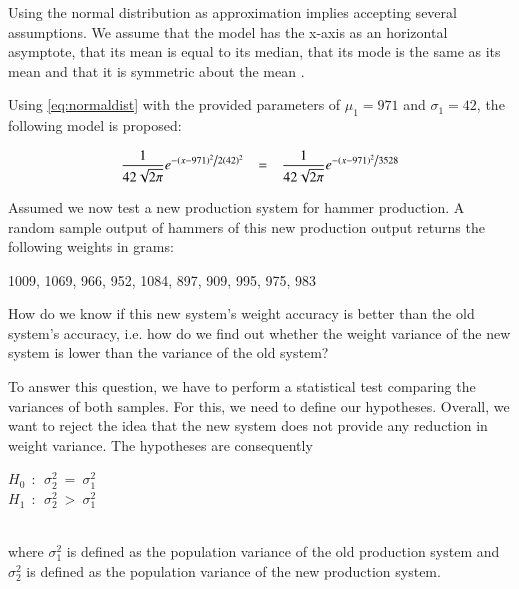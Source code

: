 Using the normal distribution as approximation implies accepting several assumptions. We assume that the model has the x-axis as an horizontal asymptote, that its mean is equal to its median, that its mode is the same as its mean and that it is symmetric about the mean \cite[Chapter~3.4]{hogg}.

Using \ref{eq:normaldist} with the provided parameters of $\mu_1 = 971$ and $\sigma_1 = 42$, the following model is proposed: 

\begin{equation} \frac{1}{{42 \sqrt {2\pi } }}e^{{{ - \left( {x - 971 } \right)^2 } \mathord{\left/ {\vphantom {{ - \left( {x - 971 } \right)^2 } {2(42) ^2 }}} \right. \kern-\nulldelimiterspace}{2(42) ^2 }}} ~~~=~~~ \frac{1}{{42 \sqrt {2\pi } }}e^{{{ - \left( {x - 971 } \right)^2 } \mathord{\left/ {\vphantom {{ - \left( {x - 971 } \right)^2 } {7056 }}} \right. \kern-\nulldelimiterspace}{3528 }}}
\label{eq:normaldistadapted}
\end{equation}



Assumed we now test a new production system for hammer production. A random sample output of hammers of this new production output returns the following weights in grams: \\

\begin{center}
    1009, 1069, 966, 952, 1084, 897, 909, 995, 975, 983
\end{center}

How do we know if this new system's weight accuracy is better than the old system's accuracy, i.e. how do we find out whether the weight variance of the new system is lower than the variance of the old system?

To answer this question, we have to perform a statistical test comparing the variances of both samples. For this, we need to define our hypotheses. Overall, we want to reject the idea that the new system does not provide any reduction in weight variance. The hypotheses are consequently 
\\
\begin{center}
$H_0~~:~~ \sigma^2_2~=~\sigma^2_1$\\ 
$H_1~~:~~ \sigma^2_2~>~\sigma^2_1$
\end{center}
\\
where $\sigma^2_1$ is defined as the population variance of the old production system and $\sigma^2_2$ is defined as the population variance of the new production system.

